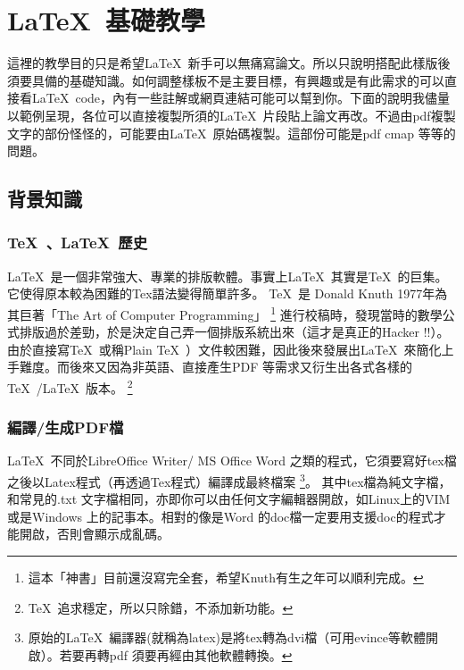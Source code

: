 \documentclass[class=NCU_thesis, crop=false, float=true]{standalone}
\begin{document}
\chapter{\LaTeX\ 基礎教學}
\label{sec:c_basicLatex}
這裡的教學目的只是希望\LaTeX\ 新手可以無痛寫論文。所以只說明搭配此樣版後須要具備的基礎知識。如何調整樣板不是主要目標，有興趣或是有此需求的可以直接看\LaTeX\  code，內有一些註解或網頁連結可能可以幫到你。下面的說明我儘量以範例呈現，各位可以直接複製所須的\LaTeX\ 片段貼上論文再改。不過由pdf複製文字的部份怪怪的，可能要由\LaTeX\  原始碼複製。這部份可能是pdf cmap 等等的問題。

\section{背景知識}

\subsection{\TeX\ 、\LaTeX\ 歷史}
\LaTeX\  是一個非常強大、專業的排版軟體。事實上\LaTeX\ 其實是\TeX\ 的巨集。它使得原本較為困難的Tex語法變得簡單許多。
\TeX\  是 Donald Knuth 1977年為其巨著「The Art of Computer Programming」
\footnote{這本「神書」目前還沒寫完全套，希望Knuth有生之年可以順利完成。}
進行校稿時，發現當時的數學公式排版過於差勁，於是決定自己弄一個排版系統出來（這才是真正的Hacker !!）。由於直接寫\TeX\ 或稱Plain \TeX\ ）文件較困難，因此後來發展出\LaTeX\ 來簡化上手難度。而後來又因為非英語、直接產生PDF 等需求又衍生出各式各樣的\TeX\ /\LaTeX\ 版本。
\footnote{\TeX\  追求穩定，所以只除錯，不添加新功能。}

\subsection{編譯/生成PDF檔}
\LaTeX\  不同於LibreOffice Writer/ MS Office Word 之類的程式，它須要寫好tex檔之後以Latex程式（再透過Tex程式）編譯成最終檔案
\footnote{原始的\LaTeX\ 編譯器(就稱為latex)是將tex轉為dvi檔（可用evince等軟體開啟）。若要再轉pdf 須要再經由其他軟體轉換。}。%
其中tex檔為純文字檔，和常見的.txt 文字檔相同，亦即你可以由任何文字編輯器開啟，如Linux上的VIM或是Windows 上的記事本。相對的像是Word 的doc檔一定要用支援doc的程式才能開啟，否則會顯示成亂碼。
\end{document}

